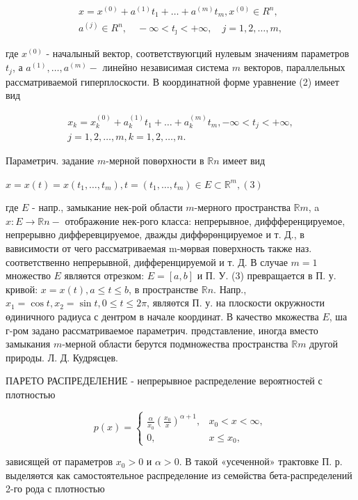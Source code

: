 \documentclass[10pt]{article}
\begin{document}
\[
\begin{gathered}
x=x^{(0)}+a^{(1)} t_{1}+\ldots+a^{(m)} t_{m}, x^{(0)} \in R^{n}, \\
a^{(j)} \in R^{n}, \quad-\infty<t_{\jmath}<+\infty, \quad j=1,2, \ldots, m,
\end{gathered}
\]

где $x^{(0)}$ - началыный вектор, соответствуюгций нулевым значениям параметров $t_{j}$, а $a^{(1)}, \ldots, a^{(m)}-$ линейно независимая система $m$ векторов, параллельных рассматриваемой гиперплоскости. В координатной форме уравнение (2) имеет вид

\[
\begin{gathered}
x_{k}=x_{k}^{(0)}+a_{k}^{(1)} t_{1}+\ldots+a_{k}^{(m)} t_{m},-\infty<t_{j}<+\infty, \\
j=1,2, \ldots, m, k=1,2, \ldots, n .
\end{gathered}
\]

Параметрич. задание $m$-мерной повөрхности в $\mathbb{R} n$ имеет вид

$x=x(t)=x\left(t_{1}, \ldots, t_{m}\right), t=\left(t_{1}, \ldots, t_{m}\right) \in E \subset \mathbb{R}^{m},(3)$

где $E$ - напр., замыкание нек-рой области $m$-мерного пространства $\mathbb{R} m$, a $x: E \rightarrow \mathbb{R} n-$ отображөние нек-рого класса: непрерывное, диффференцируемое, непрерывно дифферевцируемое, дважды диффөрөнцируемое и т. Д., в вависимости от чего рассматриваемая m-мөрвая поверхность также наз. соответственно непрерывной, дифференцируемой и т. Д. В случае $m=1$ множество $E$ являөтся отрезком: $E=[a, b]$ и П. У. (3) превращается в П. у. кривой: $x=x(t), a \leqslant t \leqslant b$, в пространстве $\mathbb{R} n$. Напр., $x_{1}=\cos t, x_{2}=\sin t, 0 \leqslant t \leqslant 2 \pi$, являөтся П. у. на плоскости окружности өдиничного радиуса с дентром в начале координат. В качество мкожества $E$, ша г-ром задано рассматриваемое параметрич. прөдставление, иногда вместо замыкания $m$-мерной области берутся подмножества пространства $\mathbb{R} m$ другой природы. Л. Д. Кудряєцев.

ПАРЕТО РАСПРЕДЕЛЕНИЕ - непрерывное распределение вероятностей с плотностью

\[
p(x)= \begin{cases}\frac{\alpha}{x_{0}}\left(\frac{x_{0}}{x}\right)^{\alpha+1}, & x_{0}<x<\infty, \\ 0, & x \leqslant x_{0},\end{cases}
\]

зависящей от параметров $x_{0}>0$ и $\alpha>0$. В такой «усеченной» трактовке П. р. выделяөтся как самостоятельное распределөние из семөйства бета-распределений 2-го рода с плотностью
\end{document}
